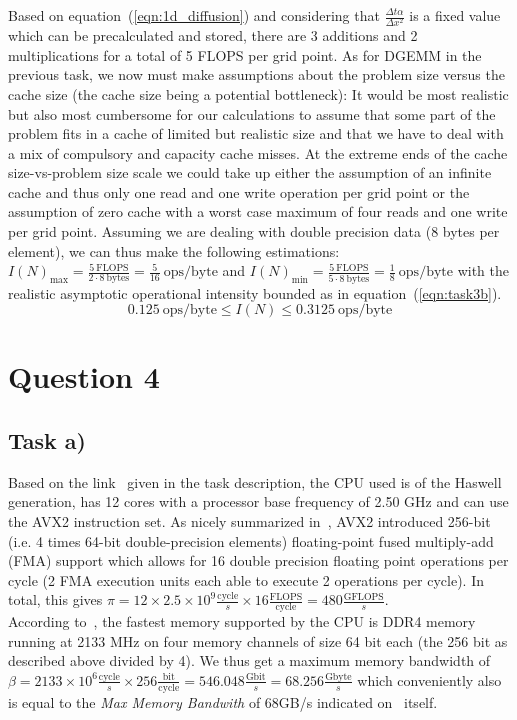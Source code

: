 \documentclass[11pt,a4paper]{article}
\begin{document}
Based on equation~(\ref{eqn:1d_diffusion}) and considering that $\frac{\Delta t \alpha}{\Delta x^2}$ is a fixed value which can be precalculated and stored, there are 3 additions and 2 multiplications for a total of 5 FLOPS per grid point. As for DGEMM in the previous task, we now must make assumptions about the problem size versus the cache size (the cache size being a potential bottleneck): It would be most realistic but also most cumbersome for our calculations to assume that some part of the problem fits in a cache of limited but realistic size and that we have to deal with a mix of compulsory and capacity cache misses. At the extreme ends of the cache size-vs-problem size scale we could take up either the assumption of an infinite cache and thus only one read and one write operation per grid point or the assumption of zero cache with a worst case maximum of four reads and one write per grid point. Assuming we are dealing with double precision data (8 bytes per element), we can thus make the following estimations: $I(N)_{\text{max}} = \frac{5\: \text{FLOPS}}{2\cdot8 \: \text{bytes}}=\frac{5}{16}\: \text{ops/byte}$ and $I(N)_{\text{min}} = \frac{5\: \text{FLOPS}}{5\cdot8 \: \text{bytes}}=\frac{1}{8}\: \text{ops/byte}$ with the realistic asymptotic operational intensity bounded as in equation~(\ref{eqn:task3b}).
\begin{equation}
0.125  \: \text{ops/byte} \leq I(N) \leq 0.3125  \: \text{ops/byte}
\label{eqn:task3b}
\end{equation}

\section{Question 4}

\subsection{Task a)}
Based on the link~\cite{intel} given in the task description, the CPU used is of the Haswell generation, has 12 cores with a processor base frequency of 2.50 GHz and can use the AVX2 instruction set. As nicely summarized in~\cite{nasa}, AVX2 introduced 256-bit (i.e. 4 times 64-bit double-precision elements) floating-point fused multiply-add (FMA) support which allows for 16 double precision floating point operations per cycle (2 FMA execution units each able to execute 2 operations per cycle). In total, this gives $\pi = 12 \times 2.5 \times 10^9 \frac{\text{cycle}}{s} \times 16 \frac{\text{FLOPS}}{\text{cycle}} = 480 \frac{\text{GFLOPS}}{s}$.\\
 According to~\cite{intel}, the fastest memory supported by the CPU is DDR4 memory running at 2133 MHz on four memory channels of size 64 bit each (the 256 bit as described above divided by 4). We thus get a maximum memory bandwidth of $\beta = 2133 \times 10^6 \frac{\text{cycle}}{s} \times 256 \frac{\text{bit}}{\text{cycle}} = 546.048 \frac{\text{Gbit}}{s} = 68.256 \frac{\text{Gbyte}}{s}$ which conveniently also is equal to the \textit{Max Memory Bandwith} of 68GB/s indicated on~\cite{intel} itself.  
\end{document}
